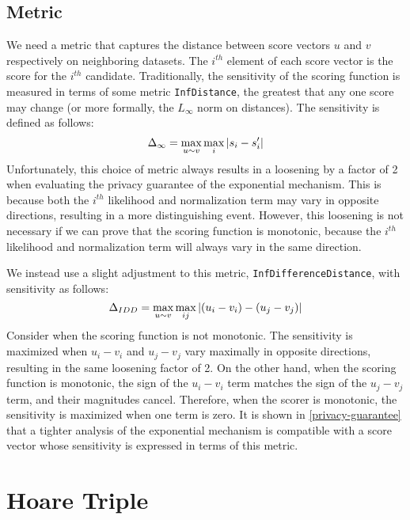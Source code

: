 \documentclass{article}
\begin{document}
\subsection{Metric}
We need a metric that captures the distance between score vectors $u$ and $v$ respectively on neighboring datasets. 
The $i^{th}$ element of each score vector is the score for the $i^{th}$ candidate.
Traditionally, the sensitivity of the scoring function is measured in terms of some metric \texttt{InfDistance}, 
the greatest that any one score may change (or more formally, the $L_\infty$ norm on distances).
The sensitivity is defined as follows:
\begin{equation}
    \Delta_{\infty} = \max\limits_{u \sim v} \max\limits_{i} \abs{s_i - s'_i}
\end{equation}
Unfortunately, this choice of metric always results in a loosening by a factor of 2 when evaluating the privacy guarantee of the exponential mechanism.
This is because both the $i^{th}$ likelihood and normalization term may vary in opposite directions, resulting in a more distinguishing event.
However, this loosening is not necessary if we can prove that the scoring function is monotonic, because the $i^{th}$ likelihood and normalization term will always vary in the same direction.

We instead use a slight adjustment to this metric, \texttt{InfDifferenceDistance}, with sensitivity as follows:
\begin{equation}
    \Delta_{IDD} = \max\limits_{u \sim v} \max\limits_{ij} \abs{(u_i - v_i) - (u_j - v_j)}
\end{equation}
Consider when the scoring function is not monotonic.
The sensitivity is maximized when $u_i - v_i$ and $u_j - v_j$ vary maximally in opposite directions, resulting in the same loosening factor of 2.
On the other hand, when the scoring function is monotonic, the sign of the $u_i - v_i$ term matches the sign of the $u_j - v_j$ term,
and their magnitudes cancel.
Therefore, when the scorer is monotonic, the sensitivity is maximized when one term is zero. 
It is shown in \ref{privacy-guarantee} that a tighter analysis of the exponential mechanism is compatible with a score vector whose sensitivity is expressed in terms of this metric.



\section{Hoare Triple}
\end{document}
